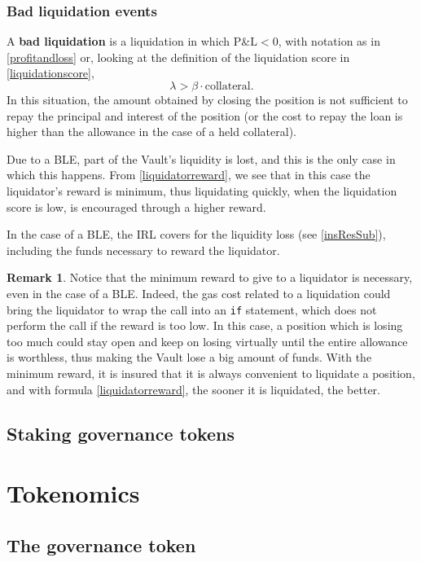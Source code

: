 \documentclass[a4paper,10 pt]{article}
\theoremstyle{definition}
\newtheorem{remark}{Remark}
\begin{document}
\subsubsection{Bad liquidation events}\label{bleSubSub}
A {\bf bad liquidation} is a liquidation in which  $\text{P\&L} < 0$, with notation as in \eqref{profitandloss} or, looking at the definition of the liquidation score in \eqref{liquidationscore}, 
$$\lambda > \beta \cdot \text{collateral}.$$ In this situation, the amount obtained by closing the position is not sufficient to repay the principal and interest of the position (or the cost to repay the loan is higher than the allowance in the case of a held collateral).

Due to a BLE, part of the Vault's liquidity is lost, and this is the only case in which this happens. From \eqref{liquidatorreward}, we see that in this case the liquidator's reward is minimum, thus liquidating quickly, when the liquidation score is low, is encouraged through a higher reward.

In the case of a BLE, the IRL covers for the liquidity loss (see \ref{insResSub}), including the funds necessary to reward the liquidator.

\begin{remark}\label{nopunishments}
Notice that the minimum reward to give to a liquidator is necessary, even in the case of a BLE. Indeed, the gas cost related to a liquidation could bring the liquidator to wrap the call into an \verb|if| statement, which does not perform the call if the reward is too low. In this case, a position which is losing too much could stay open and keep on losing virtually until the entire allowance is worthless, thus making the Vault lose a big amount of funds. With the minimum reward, it is insured that it is always convenient to liquidate a position, and with formula \eqref{liquidatorreward}, the sooner it is liquidated, the better.
\end{remark} 

\subsection{Staking governance tokens}\label{sgtSub}

\section{Tokenomics}\label{tokSec}
\subsection{The governance token}\label{govSub}
\end{document}
